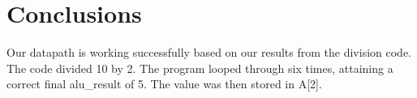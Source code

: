 \documentclass{article}
\begin{document}
\section{Conclusions}
Our datapath is working successfully based on our results from the division code. The code divided 10 by 2. The program looped through six times, attaining a correct final alu\_result of 5. The value was then stored in A[2].
\end{document}
